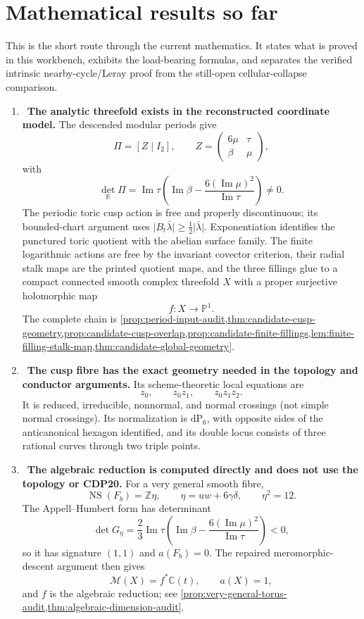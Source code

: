 \section{Mathematical results so far}
\label{sec:mathematical-summary}

This is the short route through the current mathematics.  It states what is
proved in this workbench, exhibits the load-bearing formulas, and separates
the verified intrinsic nearby-cycle/Leray proof from the still-open
cellular-collapse comparison.

\begin{enumerate}[leftmargin=1.8em,itemsep=.65em]
\item \Verified\ \textbf{The analytic threefold exists in the reconstructed
coordinate model.}
The descended modular periods give
\[
 \Pi=[Z\mid I_2],\qquad
 Z=\begin{pmatrix}6\mu&\tau\\\beta&\mu\end{pmatrix},
\]
with
\[
 \det_{\mathbb R}\Pi
 =\operatorname{Im}\tau
 \left(\operatorname{Im}\beta-
 \frac{6(\operatorname{Im}\mu)^2}{\operatorname{Im}\tau}\right)\ne0.
\]
The periodic toric cusp action is free and properly discontinuous; its
bounded-chart argument uses
\(\lvert B_t\bar\lambda\rvert\ge\frac12\lvert\bar\lambda\rvert\).
Exponentiation identifies the punctured toric quotient with the abelian
surface family.  The finite logarithmic actions are free by the invariant
covector criterion, their radial stalk maps are the printed quotient maps,
and the three fillings glue to a compact connected smooth complex
threefold \(X\) with a proper surjective holomorphic map
\[
 f:X\longrightarrow\mathbb P^1.
\]
The complete chain is
\cref{prop:period-input-audit,thm:candidate-cusp-geometry,prop:candidate-cusp-overlap,prop:candidate-finite-fillings,lem:finite-filling-stalk-map,thm:candidate-global-geometry}.

\item \Verified\ \textbf{The cusp fibre has the exact geometry needed in the
topology and conductor arguments.}
Its scheme-theoretic local equations are
\[
 z_0,\qquad z_0z_1,\qquad z_0z_1z_2.
\]
It is reduced, irreducible, nonnormal, and normal crossings (not simple
normal crossings).  Its normalization is \(\mathrm{dP}_6\), with opposite
sides of the anticanonical hexagon identified, and its double locus consists
of three rational curves through two triple points.

\item \Verified\ \textbf{The algebraic reduction is computed directly and
does not use the topology or CDP20.}
For a very general smooth fibre,
\[
 \operatorname{NS}(F_b)=\mathbb Z\eta,\qquad
 \eta=uw+6\gamma\delta,\qquad \eta^2=12.
\]
The Appell--Humbert form has determinant
\[
 \det G_\eta=
 \frac23\operatorname{Im}\tau
 \left(\operatorname{Im}\beta-
 \frac{6(\operatorname{Im}\mu)^2}{\operatorname{Im}\tau}\right)<0,
\]
so it has signature \((1,1)\) and \(a(F_b)=0\).  The repaired
meromorphic-descent argument then gives
\[
 \mathcal M(X)=f^*\mathbb C(t),\qquad a(X)=1,
\]
and \(f\) is the algebraic reduction; see
\cref{prop:very-general-torus-audit,thm:algebraic-dimension-audit}.


\end{enumerate}
